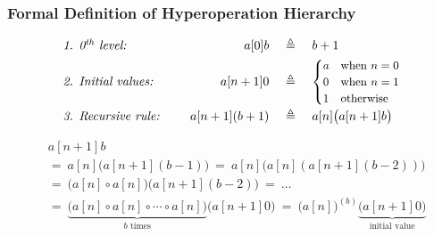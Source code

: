 \begin{frame}
\frametitle{Formal Definition of Hyperoperation Hierarchy}
\begin{equation*}
\begin{array}{lrcl}
\textit{1. 0$^{\textit{th}}$ level: } & a[0]b & ~ \triangleq ~ & b + 1 \\[3pt]
\textit{2. Initial values: } & a[n+1]0 & ~ \triangleq ~ &
\small \begin{cases}
a & \text{when } n = 0 \\
0 & \text{when } n = 1 \\
1 & \text{otherwise}
\end{cases} \\[15pt]
\textit{3. Recursive rule: } \quad & a[n+1](b+1) & ~ \triangleq ~ & a[n]\big(a[n+1]b\big)
\end{array}
\end{equation*}

\begin{equation*}
\begin{aligned}
& a[n+1]b \\
& = ~ a[n]\big(a[n+1](b-1)\big) ~ = ~ a[n]\big(a[n](a[n+1](b-2))\big) \\
& = ~ \big(a[n]\circ a[n]\big)\big(a[n+1](b-2)\big) ~ = ~ \ldots \\
& = ~ \underbrace{\big( a[n]\circ a[n]\circ \cdots \circ a[n] \big)}_{b \text{ times}} \big(a[n+1]0\big)  ~ = ~ \big(a[n]\big)^{(b)}\underbrace{\big(a[n+1]0\big)}_{\text{initial value}}
\end{aligned}
\end{equation*}

\end{frame}


